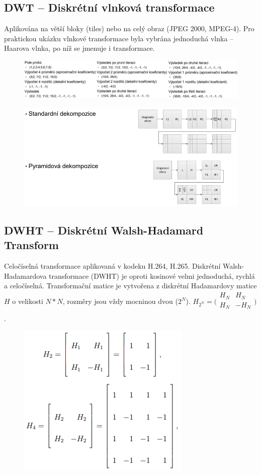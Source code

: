 \subsection{DWT -- Diskrétní vlnková transformace}

Aplikována na větší bloky (tiles) nebo na celý obraz (JPEG 2000, MPEG-4). Pro praktickou ukázku vlnkové transformace byla vybrána jednoduchá vlnka – Haarova
vlnka, po níž se jmenuje i transformace.

\begin{figure}[ht]
    \centering
    \includegraphics[width=1\linewidth]{images/dwt2.png}
\end{figure}
\FloatBarrier

\begin{figure}[ht]
    \centering
    \includegraphics[width=0.7\linewidth]{images/dwt.png}
\end{figure}
\FloatBarrier

\subsection{DWHT -- Diskrétní Walsh-Hadamard Transform}

Celočíselná transformace aplikovaná v kodeku H.264, H.265. Diskrétní Walsh-Hadamardova transformace (DWHT) je oproti kosinové velmi jednoduchá, rychlá a celočíselná. Transformační matice je vytvořena z diskrétní Hadamardovy matice $H$ o velikosti $N*N$, rozměry jsou vždy mocninou dvou ($2^N$). $H_{2^N}=\bigl(\begin{smallmatrix}
H_{N} & H_{N} \\
H_{N} & -H_{N} \\
\end{smallmatrix}\bigr)$.

\begin{figure}[ht]
    \centering
    \includegraphics[width=0.3\linewidth]{images/wht.png}
\end{figure}
\FloatBarrier

